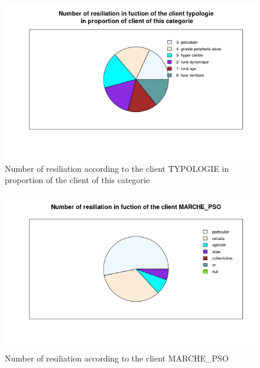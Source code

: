 \documentclass[a4paper, 11pt]{article}
\begin{document}
        \begin{figure}[!ht]
        	\centering
                \includegraphics[height = 10 cm]{Valentin/Number_of_resiliation_in_fuction_of_the_client_typologie_proportion.png}
                \caption{Number of resiliation according to the client TYPOLOGIE in proportion of the client of this categorie}
                \label{fig:resiliation_typo2}
        \end{figure}
        
                \begin{figure}[!ht]
        	\centering
                \includegraphics[height = 10 cm]{Valentin/Number_of_resiliation_in_fuction_of_the_client_MARCHE_PSO.png}
                \caption{Number of resiliation according to the client MARCHE\_PSO}
                \label{fig:resiliation_pso1}
        \end{figure}
        
\end{document}
